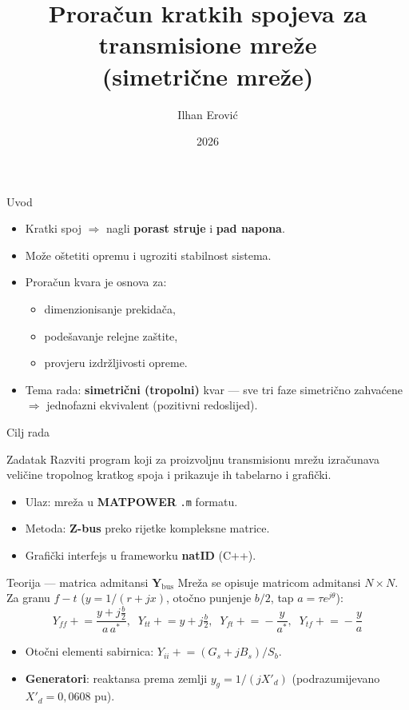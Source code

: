 \documentclass[aspectratio=169]{beamer}
\title[Kratki spojevi --- simetrične mreže]{Proračun kratkih spojeva za transmisione mreže\\(simetrične mreže)}
\author[I. Erović]{Ilhan Erović}
\institute[ETF Sarajevo]{Univerzitet u Sarajevu --- Elektrotehnički fakultet\\Seminarski rad iz predmeta SREES}
\date{2026}
\begin{document}
\begin{frame}[plain]
  \titlepage
\end{frame}

\begin{frame}{Uvod}
  \begin{itemize}
    \item Kratki spoj $\Rightarrow$ nagli \textbf{porast struje} i \textbf{pad napona}.
    \item Može oštetiti opremu i ugroziti stabilnost sistema.
    \item Proračun kvara je osnova za:
      \begin{itemize}
        \item dimenzionisanje prekidača,
        \item podešavanje relejne zaštite,
        \item provjeru izdržljivosti opreme.
      \end{itemize}
    \item Tema rada: \textbf{simetrični (tropolni)} kvar --- sve tri faze
      simetrično zahvaćene $\Rightarrow$ jednofazni ekvivalent (pozitivni redoslijed).
  \end{itemize}
\end{frame}

\begin{frame}{Cilj rada}
  \begin{block}{Zadatak}
    Razviti program koji za proizvoljnu transmisionu mrežu izračunava veličine
    tropolnog kratkog spoja i prikazuje ih tabelarno i grafički.
  \end{block}
  \begin{itemize}
    \item Ulaz: mreža u \textbf{MATPOWER} \texttt{.m} formatu.
    \item Metoda: \textbf{Z-bus} preko rijetke kompleksne matrice.
    \item Grafički interfejs u frameworku \textbf{natID} (C++).
  \end{itemize}
\end{frame}

\begin{frame}{Teorija --- matrica admitansi $\mathbf{Y}_{\text{bus}}$}
  Mreža se opisuje matricom admitansi $N\times N$. Za granu $f\!-\!t$
  ($y=1/(r+jx)$, otočno punjenje $b/2$, tap $a=\tau e^{j\theta}$):
  \[
  Y_{ff}\!\mathrel{+}=\!\frac{y+j\frac{b}{2}}{a\,a^{*}},\;\;
  Y_{tt}\!\mathrel{+}=\!y+j\tfrac{b}{2},\;\;
  Y_{ft}\!\mathrel{+}=\!-\frac{y}{a^{*}},\;\;
  Y_{tf}\!\mathrel{+}=\!-\frac{y}{a}
  \]
  \begin{itemize}
    \item Otočni elementi sabirnica: $Y_{ii}\mathrel{+}=(G_s+jB_s)/S_b$.
    \item \textbf{Generatori}: reaktansa prema zemlji $y_g=1/(jX'_d)$
      (podrazumijevano $X'_d=0{,}0608$ pu).
  \end{itemize}
\end{frame}
\end{document}
